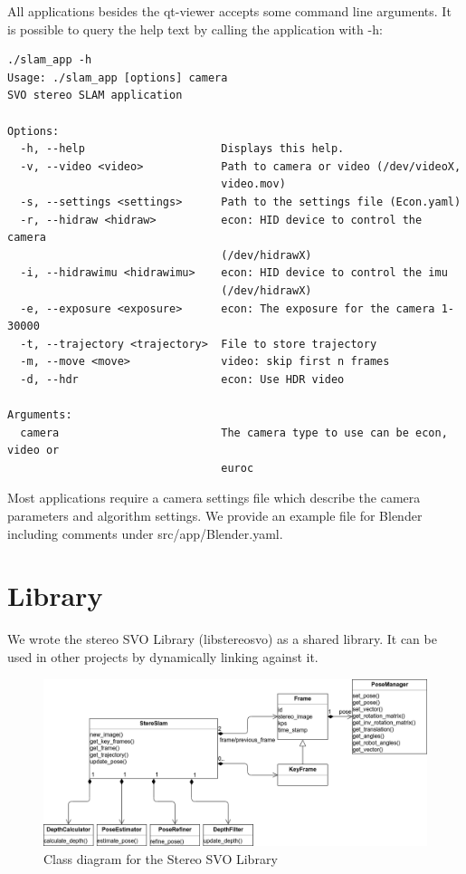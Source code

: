 \documentclass[11pt,a4paper,titlepage,oneside]{report}
\begin{document}
All applications besides the qt-viewer accepts some command line arguments. It is possible to query the help text by calling the application with -h:\\
\begin{lstlisting}
./slam_app -h
Usage: ./slam_app [options] camera
SVO stereo SLAM application

Options:
  -h, --help                     Displays this help.
  -v, --video <video>            Path to camera or video (/dev/videoX,
                                 video.mov)
  -s, --settings <settings>      Path to the settings file (Econ.yaml)
  -r, --hidraw <hidraw>          econ: HID device to control the camera
                                 (/dev/hidrawX)
  -i, --hidrawimu <hidrawimu>    econ: HID device to control the imu
                                 (/dev/hidrawX)
  -e, --exposure <exposure>      econ: The exposure for the camera 1-30000
  -t, --trajectory <trajectory>  File to store trajectory
  -m, --move <move>              video: skip first n frames
  -d, --hdr                      econ: Use HDR video

Arguments:
  camera                         The camera type to use can be econ, video or
                                 euroc
\end{lstlisting}

Most applications require a camera settings file which describe the camera parameters and algorithm settings. We provide an example file for Blender including comments under src/app/Blender.yaml.

\section{Library}

We wrote the stereo SVO Library (libstereosvo) as a shared library. It can be used in other projects by dynamically linking against it.
\begin{figure}[H]
  \centering
  \includegraphics[width=1.0\textwidth]{img/class_diagram.png}
  \caption{Class diagram for the Stereo SVO Library}\label{fig:class_diagram}
\end{figure}
\end{document}
